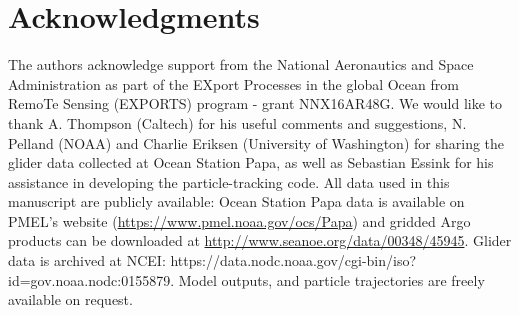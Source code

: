\documentclass[draft,linenumbers]{agujournal2018}
\begin{document}

\section*{Acknowledgments}

The authors acknowledge support from the National Aeronautics and Space Administration as part of the EXport Processes in the global Ocean from RemoTe Sensing (EXPORTS) program - grant NNX16AR48G. We would like to thank A. Thompson (Caltech) for his useful comments and suggestions, N. Pelland (NOAA) and Charlie Eriksen (University of Washington) for sharing the glider data collected at Ocean Station Papa, as well as Sebastian Essink for his assistance in developing the particle-tracking code. All data used in this manuscript are publicly available: Ocean Station Papa data is available on PMEL's website (\url{https://www.pmel.noaa.gov/ocs/Papa}) and gridded Argo products can be downloaded at \url{http://www.seanoe.org/data/00348/45945}. Glider data is archived at NCEI: https://data.nodc.noaa.gov/cgi-bin/iso?id=gov.noaa.nodc:0155879. Model outputs, and particle trajectories are freely available on request. %


%



%
%


%
%
\end{document}
